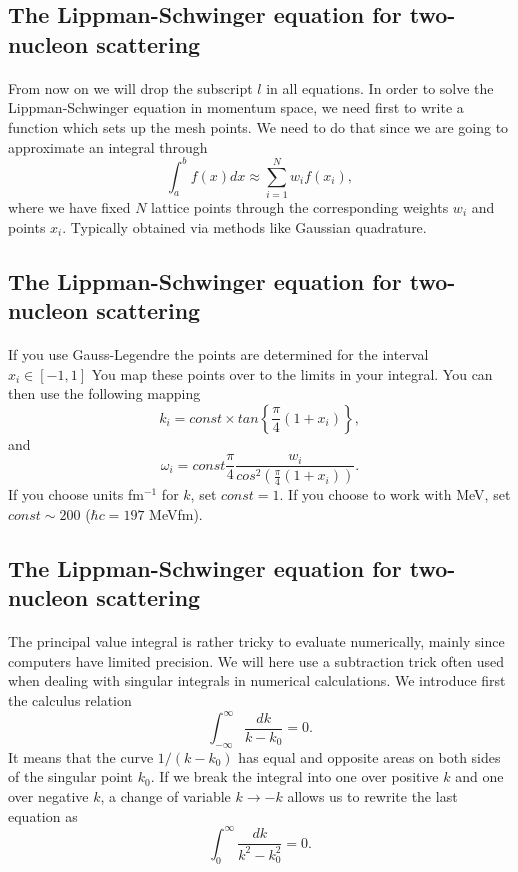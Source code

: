 \documentclass[%
twoside,                 %
final,                   %
10pt]{article}
\begin{document}
\subsection*{The Lippman-Schwinger equation for two-nucleon scattering}

\paragraph{}
From now on we will drop the subscript $l$ in all equations.
In order to solve the Lippman-Schwinger equation 
in momentum space, we need first to write 
a function which sets up the mesh points. 
We need to do that since we are going to approximate an integral
through 
\[
   \int_a^bf(x)dx\approx\sum_{i=1}^Nw_if(x_i),
\]
where we have fixed $N$ lattice points through the corresponding weights
$w_i$ and points $x_i$. Typically obtained via methods like Gaussian quadrature.



\subsection*{The Lippman-Schwinger equation for two-nucleon scattering}

\paragraph{}
If you use Gauss-Legendre the points are determined for the interval $x_i\in [-1,1]$
You map these points over to the limits in your integral. You can then
use the following mapping
\[
  k_i=const\times tan\left\{\frac{\pi}{4}(1+x_i)\right\},
\]
and 
\[
   \omega_i= const\frac{\pi}{4}\frac{w_i}{cos^2\left(\frac{\pi}{4}(1+x_i)\right)}.
\]
If you choose units fm$^{-1}$ for $k$, set $const=1$. If you choose to work
with MeV, set $const\sim 200$ ($\hbar c=197$ MeVfm).



\subsection*{The Lippman-Schwinger equation for two-nucleon scattering}

\paragraph{}
The principal value integral is rather tricky
to evaluate numerically, mainly since computers have limited
precision. We will here use a subtraction trick often used
when dealing with singular integrals in numerical calculations.
We introduce first the calculus relation
\[
  \int_{-\infty}^{\infty} \frac{dk}{k-k_0} =0.
\]
It means that the curve $1/(k-k_0)$ has equal and opposite
areas on both sides of the singular point $k_0$. If we break
the integral into one over positive $k$ and one over 
negative $k$, a change of variable $k\rightarrow -k$ 
allows us to rewrite the last equation as
\[
  \int_{0}^{\infty} \frac{dk}{k^2-k_0^2} =0.
\]
\end{document}

